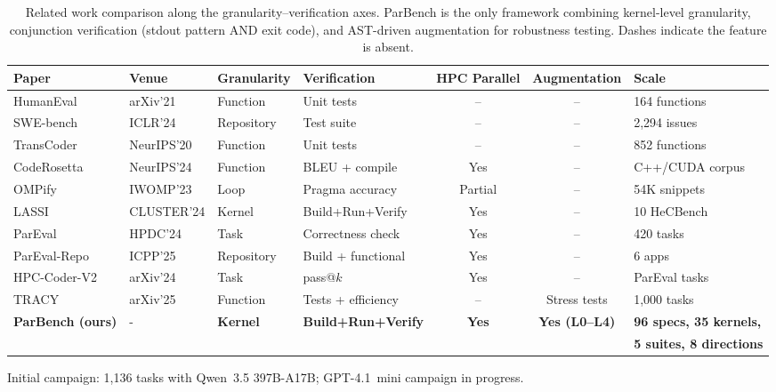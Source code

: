 \documentclass{article}
\begin{document}
\begin{table}[t]
\centering
\caption{Related work comparison along the granularity--verification axes. ParBench is the only framework combining kernel-level granularity, conjunction verification (stdout pattern AND exit code), and AST-driven augmentation for robustness testing. Dashes indicate the feature is absent.}
\label{tab:related-work}
\small
\begin{tabular}{@{}llllccl@{}}
\toprule
Paper & Venue & Granularity & Verification & HPC Parallel & Augmentation & Scale \\
\midrule
HumanEval~\cite{HumanEval2021} & arXiv'21 & Function & Unit tests & -- & -- & 164 functions \\
SWE-bench~\cite{SWEbench2024} & ICLR'24 & Repository & Test suite & -- & -- & 2,294 issues \\
TransCoder~\cite{TransCoder2020} & NeurIPS'20 & Function & Unit tests & -- & -- & 852 functions \\
CodeRosetta~\cite{CodeRosetta2024} & NeurIPS'24 & Function & BLEU + compile & Yes & -- & C++/CUDA corpus \\
OMPify~\cite{OMPify2023} & IWOMP'23 & Loop & Pragma accuracy & Partial & -- & 54K snippets \\
LASSI~\cite{LASSI2024} & CLUSTER'24 & Kernel & Build+Run+Verify & Yes & -- & 10 HeCBench \\
ParEval~\cite{ParEval2024} & HPDC'24 & Task & Correctness check & Yes & -- & 420 tasks \\
ParEval-Repo~\cite{ParEvalRepo2025} & ICPP'25 & Repository & Build + functional & Yes & -- & 6 apps \\
HPC-Coder-V2~\cite{HPCCoderV2} & arXiv'24 & Task & pass@$k$ & Yes & -- & ParEval tasks \\
TRACY~\cite{TRACY2025} & arXiv'25 & Function & Tests + efficiency & -- & Stress tests & 1,000 tasks \\
\textbf{ParBench (ours)} & - & \textbf{Kernel} & \textbf{Build+Run+Verify} & \textbf{Yes} & \textbf{Yes (L0--L4)} & \textbf{96 specs, 35 kernels, } \\
& & & & & & \textbf{5 suites, 8 directions} \\
\bottomrule
\end{tabular}
\par\vspace{2pt}
{\footnotesize Initial campaign: 1,136 tasks with Qwen~3.5 397B-A17B; GPT-4.1~mini campaign in progress.}
\end{table}
\end{document}
